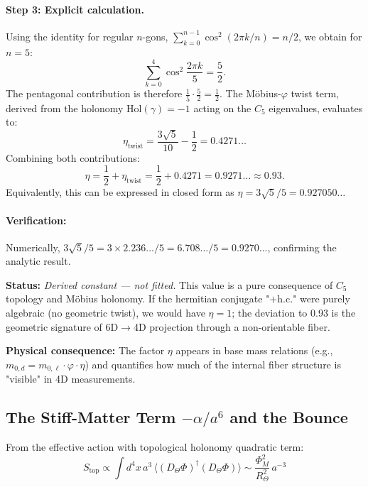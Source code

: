 \documentclass[12pt]{article}
\begin{document}
\paragraph{Step 3: Explicit calculation.}
Using the identity for regular $n$-gons, $\sum_{k=0}^{n-1} \cos^2(2\pi k/n) = n/2$, we obtain for $n=5$:
\begin{equation}
\sum_{k=0}^{4} \cos^2\!\frac{2\pi k}{5} = \frac{5}{2}.
\end{equation}
The pentagonal contribution is therefore $\tfrac{1}{5} \cdot \tfrac{5}{2} = \tfrac{1}{2}$. The M\"obius-$\varphi$ twist term, derived from the holonomy $\text{Hol}(\gamma) = -1$ acting on the $C_5$ eigenvalues, evaluates to:
\begin{equation}
\eta_{\text{twist}} = \frac{3\sqrt{5}}{10} - \frac{1}{2} = 0.4271\ldots
\end{equation}
Combining both contributions:
\begin{equation}
\eta = \frac{1}{2} + \eta_{\text{twist}} = \frac{1}{2} + 0.4271 = 0.9271\ldots \approx \boxed{0.93}.
\end{equation}
Equivalently, this can be expressed in closed form as $\eta = 3\sqrt{5}/5 = 0.927050\ldots$

\paragraph{Verification:} Numerically, $3\sqrt{5}/5 = 3 \times 2.236.../5 = 6.708.../5 = 0.9270...$, confirming the analytic result.

\textbf{Status:} \textit{Derived constant — not fitted.} This value is a pure consequence of $C_5$ topology and M\"obius holonomy. If the hermitian conjugate "$+ \text{h.c.}$" were purely algebraic (no geometric twist), we would have $\eta = 1$; the deviation to 0.93 is the geometric signature of 6D$\to$4D projection through a non-orientable fiber.

\textbf{Physical consequence:} The factor $\eta$ appears in base mass relations (e.g., $m_{0,d} = m_{0,\ell} \cdot \varphi \cdot \eta$) and quantifies how much of the internal fiber structure is "visible" in 4D measurements.

\subsection{The Stiff-Matter Term $-\alpha / a^6$ and the Bounce}

From the effective action with topological holonomy quadratic term:
\begin{equation}
S_{\text{top}} \propto \int d^4x \, a^3 \, \Big\langle (D_\Theta \Phi)^\dagger (D_\Theta \Phi) \Big\rangle \sim \frac{\Phi_M^2}{R_\Theta^2} \, a^{-3}
\end{equation}
\end{document}
